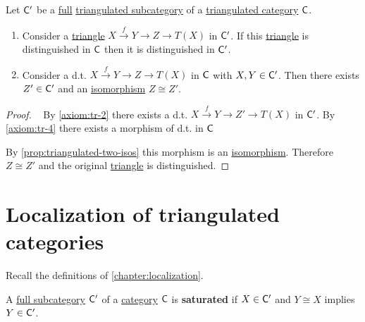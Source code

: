\documentclass[../../main]{subfiles}
\begin{document}
\begin{corollary}
  Let \(\mathsf{C'}\) be a \hyperref[def:subcategory]{full} \hyperref[def:triangulated-subcategory]{triangulated subcategory} of a \hyperref[def:triangulated-category]{triangulated category} \(\mathsf{C}\).
  \begin{enumerate}
    \item Consider a \hyperref[def:triangle]{triangle} \(X \xrightarrow{f} Y \to Z \to T(X)\) in \(\mathsf{C'}\).
          If this \hyperref[def:triangle]{triangle} is distinguished in \(\mathsf{C}\) then it is distinguished in \(\mathsf{C'}\).
    \item Consider a d.t. \(X \xrightarrow{f} Y \to Z \to T(X)\) in \(\mathsf{C}\) with \(X, Y \in \mathsf{C'}\). Then there exists \(Z' \in \mathsf{C'}\) and an \hyperref[def:categorical-isomorphim]{isomorphism} \(Z \cong Z'\).
  \end{enumerate}
\end{corollary}
\begin{proof}~
  By \ref{axiom:tr-2} there exists a d.t. \(X \xrightarrow{f} Y \to Z' \to T(X)\) in \(\mathsf{C'}\).
  By \ref{axiom:tr-4} there exists a morphism of d.t. in \(\mathsf{C}\)
  \begin{center}
  \end{center}
  By \autoref{prop:triangulated-two-isos} this morphism is an \hyperref[def:categorical-isomorphism]{isomorphism}.
  Therefore \(Z \cong Z'\) and the original \hyperref[def:triangle]{triangle} is distinguished.
\end{proof}

\section{Localization of triangulated categories}

Recall the definitions of \autoref{chapter:localization}.

\begin{definition}\label{def:full-saturated-subcategory}
  A \hyperref[def:full-subcategory]{full subcategory} \(\mathsf{C'}\) of a \hyperref[def:category]{category} \(\mathsf{C}\) is \textbf{saturated} if \(X \in \mathsf{C'}\) and \(Y \cong X\) implies \(Y \in \mathsf{C'}\).
\end{definition}
\end{document}
